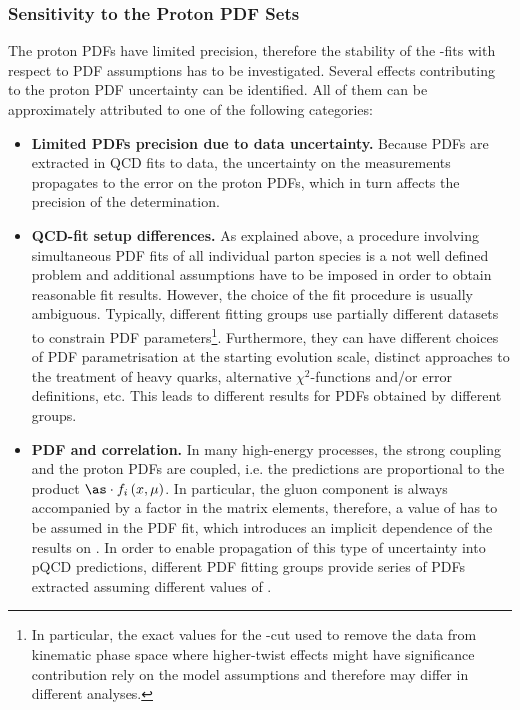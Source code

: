 \subsubsection{Sensitivity to the Proton PDF Sets}
\label{subsec:aspdfassump}
The proton PDFs have limited precision, therefore the stability of the \asz-fits with respect to PDF assumptions has to be investigated. Several effects contributing to the proton PDF uncertainty can be identified. All of them can be approximately attributed to one of the following categories:
\begin{itemize}
 \item \textbf{Limited PDFs precision due to data uncertainty.} Because PDFs are extracted in QCD fits to data, the uncertainty on the measurements propagates to the error on the proton PDFs, which in turn affects the precision of the \asz determination.
 \item \textbf{QCD-fit setup differences.} As explained above, a procedure involving simultaneous PDF fits of all individual parton species is a not well defined problem and additional assumptions have to be imposed in order to obtain reasonable fit results. However, the choice of the fit procedure is usually ambiguous. Typically, different fitting groups use partially different datasets to constrain PDF parameters\footnote{In particular, the exact values for the \qsq-cut used to remove the data from kinematic phase space where higher-twist effects might have significance contribution rely on the model assumptions and therefore may differ in different analyses.}. Furthermore, they can have different choices of PDF parametrisation at the starting evolution scale, distinct approaches to the treatment of heavy quarks, alternative $\chi^2$-functions and/or error definitions, etc. This leads to different results for PDFs obtained by different groups.
 \item \textbf{PDF and \asz correlation.} In many high-energy processes, the strong coupling and the proton PDFs are coupled, i.e. the predictions are proportional to the product $\as\cdot f_i\left(x,\mu\right)$. In particular, the gluon component is always accompanied by a factor \as in the matrix elements, therefore, a value of \asz has to be assumed in the PDF fit, which introduces an implicit dependence of the results on \asz. In order to enable propagation of this type of uncertainty into pQCD predictions, different PDF fitting groups provide series of PDFs extracted assuming different values of \asz.
\end{itemize}

